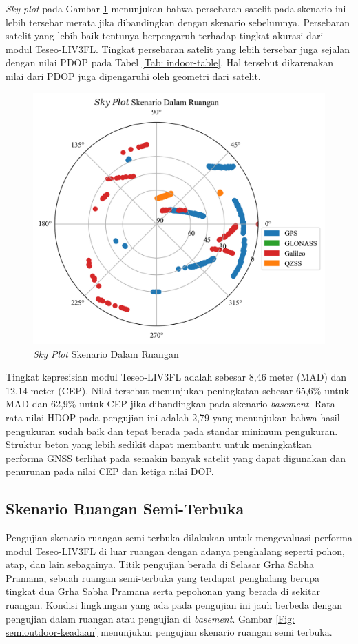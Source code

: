 \textit{Sky plot} pada Gambar \ref{Fig: indoor-sky_plot} menunjukan bahwa persebaran satelit pada skenario ini lebih tersebar merata jika dibandingkan dengan skenario sebelumnya. Persebaran satelit yang lebih baik tentunya berpengaruh terhadap tingkat akurasi dari modul Teseo-LIV3FL. Tingkat persebaran satelit yang lebih tersebar juga sejalan dengan nilai PDOP pada Tabel \ref{Tab: indoor-table}. Hal tersebut dikarenakan nilai dari PDOP juga dipengaruhi oleh geometri dari satelit.

\begin{figure}[H]
	\centering
	\captionsetup{justification=centering}
	\includegraphics[width=12cm]{contents/chapter-4/2-skenario-indoor/sky_plot.png}
	\caption{\textit{Sky Plot} Skenario Dalam Ruangan}
	\label{Fig: indoor-sky_plot}
\end{figure}

Tingkat kepresisian modul Teseo-LIV3FL adalah sebesar 8,46 meter (MAD) dan 12,14 meter (CEP). Nilai tersebut menunjukan peningkatan sebesar 65,6\% untuk MAD dan 62,9\% untuk CEP jika dibandingkan pada skenario \textit{basement}. Rata-rata nilai HDOP pada pengujian ini adalah 2,79 yang menunjukan bahwa hasil pengukuran sudah baik dan tepat berada pada standar minimum pengukuran. Struktur beton yang lebih sedikit dapat membantu untuk meningkatkan performa GNSS terlihat pada semakin banyak satelit yang dapat digunakan dan penurunan pada nilai CEP dan ketiga nilai DOP.

\subsection{Skenario Ruangan Semi-Terbuka}
Pengujian skenario ruangan semi-terbuka dilakukan untuk mengevaluasi performa modul Teseo-LIV3FL di luar ruangan dengan adanya penghalang seperti pohon, atap, dan lain sebagainya. Titik pengujian berada di Selasar Grha Sabha Pramana, sebuah ruangan semi-terbuka yang terdapat penghalang berupa tingkat dua Grha Sabha Pramana serta pepohonan yang berada di sekitar ruangan. Kondisi lingkungan yang ada pada pengujian ini jauh berbeda dengan pengujian dalam ruangan atau pengujian di \textit{basement}. Gambar \ref{Fig: semioutdoor-keadaan} menunjukan pengujian skenario ruangan semi terbuka.

